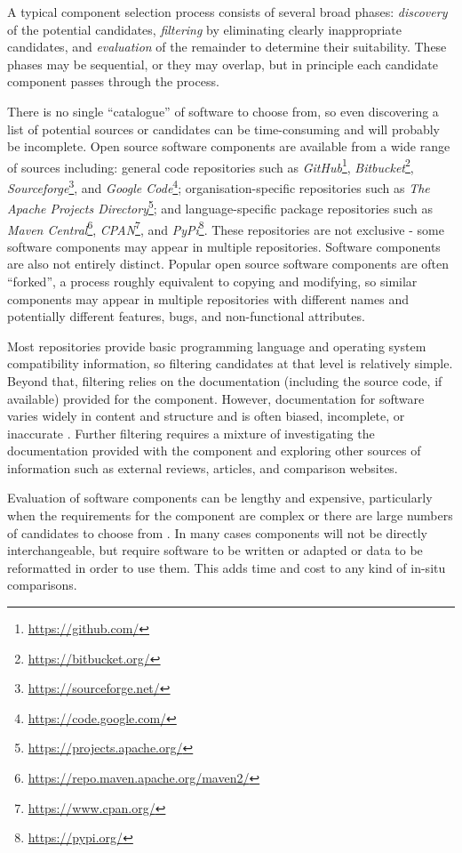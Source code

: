 A typical component selection process consists of several broad phases: \emph{discovery} of the potential candidates, \emph{filtering} by eliminating clearly inappropriate candidates, and \emph{evaluation} of the remainder to determine their suitability. These phases may be sequential, or they may overlap, but in principle each candidate component passes through the process.

There is no single \enquote{catalogue} of software to choose from, so even discovering a list of potential sources or candidates can be time-consuming and will probably be incomplete. Open source software components are available from a wide range of sources including: general code repositories such as \emph{GitHub}\footnote{\url{https://github.com/}}, \emph{Bitbucket}\footnote{\url{https://bitbucket.org/}}, \emph{Sourceforge}\footnote{\url{https://sourceforge.net/}}, and \emph{Google Code}\footnote{\url{https://code.google.com/}}; organisation-specific repositories such as \emph{The Apache Projects Directory}\footnote{\url{https://projects.apache.org/}}; and language-specific package repositories such as \emph{Maven Central}\footnote{\url{https://repo.maven.apache.org/maven2/}}, \emph{CPAN}\footnote{\url{https://www.cpan.org/}}, and \emph{PyPi}\footnote{\url{https://pypi.org/}}. These repositories are not exclusive - some software components may appear in multiple repositories. Software components are also not entirely distinct. Popular open source software components are often \enquote{forked}, a process roughly equivalent to copying and modifying, so similar components may appear in multiple repositories with different names and potentially different features, bugs, and non-functional attributes.

Most repositories provide basic \gls{programming language} and operating system compatibility information, so filtering candidates at that level is relatively simple. Beyond that, filtering relies on the documentation (including the source code, if available) provided for the component. However, documentation for software varies widely in content and structure and is often biased, incomplete, or inaccurate \citep{Bertoa2003}. Further filtering requires a mixture of investigating the documentation provided with the component and exploring other sources of information such as external reviews, articles, and comparison websites.

Evaluation of software components can be lengthy and expensive, particularly when the requirements for the component are complex or there are large numbers of candidates to choose from \citep{Badampudi2016}. In many cases components will not be directly interchangeable, but require software to be written or adapted or data to be reformatted in order to use them. This adds time and cost to any kind of in-situ comparisons.

